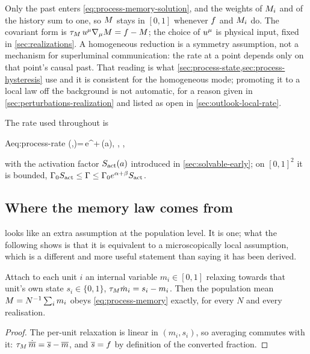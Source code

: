 Only the past enters \cref{eq:process-memory-solution}, and the weights of
$M_i$ and of the history sum to one, so $M$ stays in $[0,1]$ whenever
$f$ and $M_i$ do. The covariant form is $\tau_{M}\,u^\mu\nabla_\mu
M=f-M$; the choice of $u^{\mu}$ is physical input, fixed in
\cref{sec:realizations}. A homogeneous reduction is a symmetry assumption, not
a mechanism for superluminal communication: the rate at a point depends only on
that point's causal past. That reading is what
\cref{sec:process-state,sec:process-hysteresis} use and it is consistent for
the homogeneous mode; promoting it to a local law off the background is not
automatic, for a reason given in \cref{sec:perturbations-realization} and
listed as open in \cref{sec:outlook-local-rate}.

The rate used throughout is
%
\begin{keyresult}{A}{eq:process-rate}
  \Gam(\fconv,\Mmem)=\Gamz\,e^{\alpha \fconv+\beta \Mmem}\,\actS(a),
  \qquad \alpha,\beta{} ,
\end{keyresult}
%
with the activation factor $S_{\mathrm{act}}(a)$ introduced in
\cref{sec:solvable-early}; on $[0,1]^2$ it is bounded,
$\Gamma_{0}S_{\mathrm{act}}\le\Gamma\le\Gamma_{0} e^{\alpha+\beta}S_{\mathrm{act}}$.

\subsection{Where the memory law comes from}\label{sec:process-memory-origin}

 looks like an extra assumption at the population
level. It is one; what the following shows is that it is equivalent to a
microscopically local assumption, which is a different and more useful
statement than saying it has been derived.

\begin{proposition}
  \label{prop:memory-origin}
  Attach to each unit $i$ an internal variable $m_i\in[0,1]$ relaxing towards
  that unit's own state $s_i\in\{0,1\}$,
  $\tau_{M}\dot m_i=s_i-m_i$. Then the population mean
  $M=N^{-1}\sum_i m_i$ obeys \cref{eq:process-memory} exactly, for every
  $N$ and every realisation.
\end{proposition}

\begin{proof}
  The per-unit relaxation is linear in $(m_i,s_i)$, so averaging commutes with
  it: $\tau_{M}\,\dot{\overline{m}}=\overline{s}-\overline{m}$, and
  $\overline{s}=f$ by definition of the converted fraction.
\end{proof}

